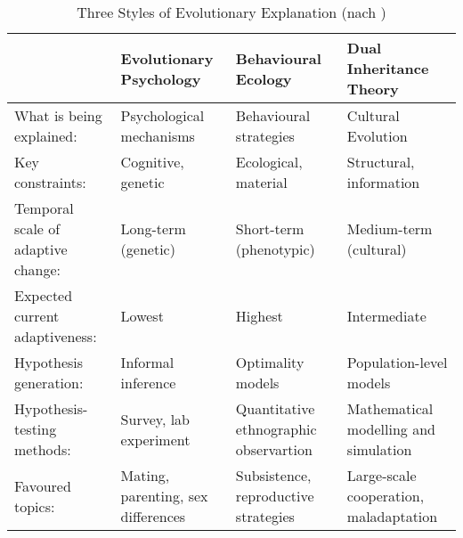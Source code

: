 \documentclass[openany,twoside,twocolumn]{book}
\begin{document}
\begin{table*}

\caption{\label{tab:smiththreestyles}Three Styles of Evolutionary Explanation (nach \textcite{SmithThreestylesevolutionary2000})}
\centering
\fontsize{8}{10}\selectfont
\begin{tabu} to 
\toprule
 & Evolutionary Psychology & Behavioural Ecology & Dual Inheritance Theory\\
\midrule
What is being explained: & Psychological mechanisms & Behavioural strategies & Cultural Evolution\\
\addlinespace
Key constraints: & Cognitive, genetic & Ecological, material & Structural, information\\
\addlinespace
Temporal scale of adaptive change: & Long-term (genetic) & Short-term (phenotypic) & Medium-term (cultural)\\
\addlinespace
Expected current adaptiveness: & Lowest & Highest & Intermediate\\
\addlinespace
Hypothesis generation: & Informal inference & Optimality models & Population-level models\\
\addlinespace
Hypothesis-testing methods: & Survey, lab experiment & Quantitative ethnographic observartion & Mathematical modelling and simulation\\
\addlinespace
Favoured topics: & Mating, parenting, sex differences & Subsistence, reproductive strategies & Large-scale cooperation, maladaptation\\
\bottomrule
\end{tabu}
\end{table*}
\end{document}
